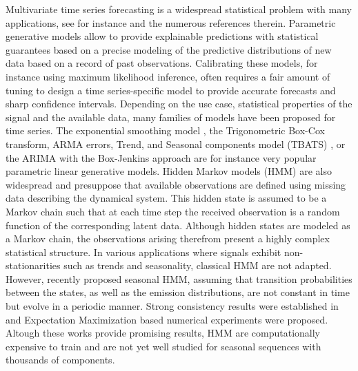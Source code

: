 \documentclass{article} %
\begin{document}
Multivariate time series forecasting is a widespread statistical problem with  many applications, see for instance \citep{sarkka2013bayesian, douc2014nonlinear, zucchini2017hidden} and the numerous references therein.
 Parametric generative models allow to provide explainable predictions with statistical guarantees based on a precise modeling of the predictive distributions of new data based on a record of past observations. %
Calibrating these models, for instance using maximum likelihood inference, often requires a fair amount of tuning to design a time series-specific model to provide  accurate forecasts and sharp confidence intervals.  Depending on the use case, statistical properties of the signal and the available data, many families of models have been proposed for time series.  The exponential smoothing model \citep{RePEc:inm:oropre:v:9:y:1961:i:5:p:673-685}, the Trigonometric Box-Cox transform, ARMA errors, Trend, and Seasonal components model (TBATS) \cite{doi:10.1198/jasa.2011.tm09771}, or the ARIMA with the Box-Jenkins approach \citep{box2015time} are for instance very popular parametric linear generative models.  Hidden Markov models (HMM) are also widespread and presuppose that available observations are defined using missing data describing the dynamical system. This hidden state is assumed to be a Markov chain such that at each time step the received observation is a random function of the corresponding latent data.  Although hidden states are modeled as a Markov chain, the observations arising therefrom present a highly complex statistical structure. %
 In various applications where signals exhibit non-stationarities such as trends and seasonality, classical HMM are not adapted. However, \citep{touron2017modeling}  recently proposed seasonal HMM, assuming that transition probabilities between the states, as well as the emission distributions, are not constant in time but evolve in a periodic manner. Strong consistency results were established in \citep{touron2019consistency} and Expectation Maximization based numerical experiments were proposed.
Altough these works provide promising results, HMM are computationally expensive to train and are not yet well studied for seasonal  sequences with thousands of components.
 
\end{document}
